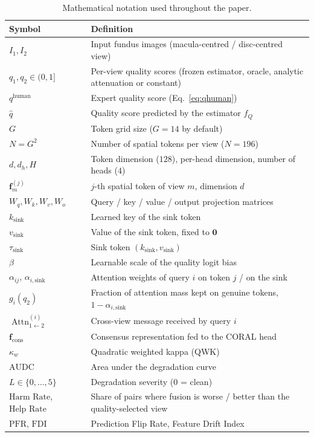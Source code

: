 \documentclass[final,5p,times,twocolumn,authoryear]{elsarticle}
\newcommand{\Attn}[1]{\operatorname{Attn}_{1\leftarrow 2}^{(#1)}}
\theoremstyle{plain}
\theoremstyle{remark}
\begin{document}
\begin{table}[!tb]
\centering
\caption{Mathematical notation used throughout the paper.}
\label{tab:notation}
\footnotesize
\begin{tabular}{ll}
\toprule
Symbol & Definition \\
\midrule
$I_1, I_2$             & Input fundus images (macula-centred / disc-centred view) \\
$q_1, q_2 \in (0,1]$   & Per-view quality scores (frozen estimator, oracle, analytic attenuation or constant) \\
$q^{\text{human}}$     & Expert quality score (Eq.~\ref{eq:qhuman}) \\
$\hat{q}$              & Quality score predicted by the estimator $f_Q$ \\
$G$                    & Token grid size ($G=14$ by default) \\
$N = G^2$              & Number of spatial tokens per view ($N=196$) \\
$d, d_h, H$            & Token dimension ($128$), per-head dimension, number of heads ($4$) \\
$\mathbf{f}_m^{(j)}$   & $j$-th spatial token of view $m$, dimension $d$ \\
$W_q, W_k, W_v, W_o$   & Query / key / value / output projection matrices \\
$k_{\text{sink}}$      & Learned key of the sink token \\
$v_{\text{sink}}$      & Value of the sink token, fixed to $\mathbf{0}$ \\
$\tau_{\text{sink}}$   & Sink token $(k_{\text{sink}}, v_{\text{sink}})$ \\
$\beta$                & Learnable scale of the quality logit bias \\
$\alpha_{ij}$, $\alpha_{i,\text{sink}}$ & Attention weights of query $i$ on token $j$ / on the sink \\
$g_i(q_2)$             & Fraction of attention mass kept on genuine tokens, $1-\alpha_{i,\text{sink}}$ \\
$\Attn{i}$             & Cross-view message received by query $i$ \\
$\mathbf{f}_{\text{cons}}$ & Consensus representation fed to the CORAL head \\
$\kappa_w$             & Quadratic weighted kappa (QWK) \\
$\mathrm{AUDC}$        & Area under the degradation curve \\
$L \in \{0,\ldots,5\}$ & Degradation severity (0 = clean) \\
$\text{Harm Rate}$, $\text{Help Rate}$ & Share of pairs where fusion is worse / better than the quality-selected view \\
$\mathrm{PFR}$, $\mathrm{FDI}$ & Prediction Flip Rate, Feature Drift Index \\
\bottomrule
\end{tabular}
\end{table}
\end{document}
